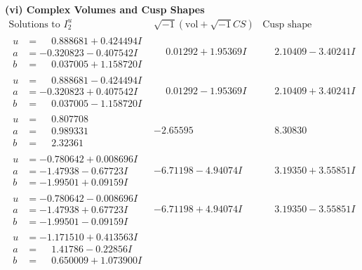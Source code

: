 \documentclass[1p]{elsarticle_modified}
\theoremstyle{definition}
\newcommand{\I}{\sqrt{-1}}
\begin{document}
\newpage\flushleft \textbf{(vi) Complex Volumes and Cusp Shapes}
$$\begin{array}{c|c|c}  
\text{Solutions to }I^u_{2}& \I (\text{vol} + \sqrt{-1}CS) & \text{Cusp shape}\\
 \hline 
\begin{aligned}
u &= \phantom{-}0.888681 + 0.424494 I \\
a &= -0.320823 - 0.407542 I \\
b &= \phantom{-}0.037005 + 1.158720 I\end{aligned}
 & \phantom{-}0.01292 + 1.95369 I & \phantom{-}2.10409 - 3.40241 I \\ \hline\begin{aligned}
u &= \phantom{-}0.888681 - 0.424494 I \\
a &= -0.320823 + 0.407542 I \\
b &= \phantom{-}0.037005 - 1.158720 I\end{aligned}
 & \phantom{-}0.01292 - 1.95369 I & \phantom{-}2.10409 + 3.40241 I \\ \hline\begin{aligned}
u &= \phantom{-}0.807708\phantom{ +0.000000I} \\
a &= \phantom{-}0.989331\phantom{ +0.000000I} \\
b &= \phantom{-}2.32361\phantom{ +0.000000I}\end{aligned}
 & -2.65595\phantom{ +0.000000I} & \phantom{-}8.30830\phantom{ +0.000000I} \\ \hline\begin{aligned}
u &= -0.780642 + 0.008696 I \\
a &= -1.47938 - 0.67723 I \\
b &= -1.99501 + 0.09159 I\end{aligned}
 & -6.71198 - 4.94074 I & \phantom{-}3.19350 + 3.55851 I \\ \hline\begin{aligned}
u &= -0.780642 - 0.008696 I \\
a &= -1.47938 + 0.67723 I \\
b &= -1.99501 - 0.09159 I\end{aligned}
 & -6.71198 + 4.94074 I & \phantom{-}3.19350 - 3.55851 I \\ \hline\begin{aligned}
u &= -1.171510 + 0.413563 I \\
a &= \phantom{-}1.41786 - 0.22856 I \\
b &= \phantom{-}0.650009 + 1.073900 I\end{aligned}

\end{array}$$
\end{document}

